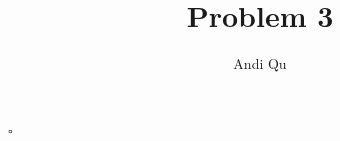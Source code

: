 \documentclass[11pt]{scrartcl}
\title{Problem 3}
\author{Andi Qu}
\newcommand*{\QED}{\hfill\ensuremath{\square}}%
\begin{document}
\maketitle



\QED
\end{document}
